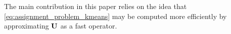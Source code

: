 The main contribution in this paper relies on the idea that \eqref{eq:assignment_problem_kmeans} may be computed more efficiently by approximating ${\mathbf{U}}$ as a fast operator.

%

%
%


%
%
%


